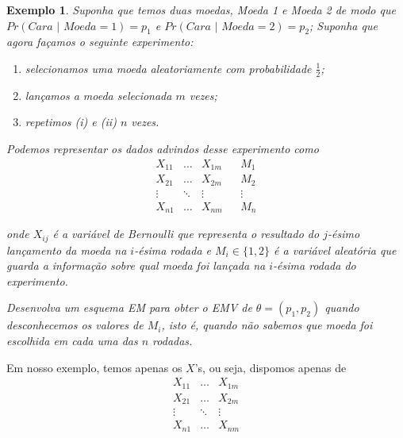 \documentclass{article}
\newtheorem{example}{Exemplo}
\begin{document}
\begin{example}
    \label{example1}
    Suponha que temos duas moedas, Moeda 1 e Moeda 2 de modo que $Pr(\textit{Cara }|\textit{ Moeda} = 1) = p_1$ e $Pr(\textit{Cara }|\textit{ Moeda} = 2) = p_2$; Suponha que agora façamos o seguinte experimento:
    \begin{enumerate}
        \item[(i)]
            selecionamos uma moeda aleatoriamente com probabilidade $\frac{1}{2}$;
            
        \item[(ii)]
            lançamos a moeda selecionada $m$ vezes;
            
        \item[(iii)]
            repetimos (i) e (ii) $n$ vezes.
    \end{enumerate}
        
    Podemos representar os dados advindos desse experimento como
    \begin{equation*}
        \begin{array}{ccccc}
            X_{11} & \dots & X_{1m} & & M_1 \\
            X_{21} & \dots & X_{2m} & & M_2 \\
            \vdots & \ddots & \vdots & & \vdots \\
            X_{n1} & \dots & X_{nm} & & M_n 
        \end{array}
    \end{equation*}
    
    \noindent onde $X_{ij}$ é a variável de Bernoulli que representa o resultado do $j$-ésimo lançamento da moeda na $i$-ésima rodada e $M_i \in \{1, 2\}$ é a variável aleatória que guarda a informação sobre qual moeda foi lançada na $i$-ésima rodada do experimento.
    
    Desenvolva um esquema EM para obter o EMV de $\theta = (p_1, p_2)$ quando desconhecemos os valores de $M_i$, isto é, quando não sabemos que moeda foi escolhida em cada uma das $n$ rodadas.
\end{example}

Em nosso exemplo, temos apenas os $X$'s, ou seja, dispomos apenas de
\begin{equation*}
    \begin{array}{ccc}
        X_{11} & \dots & X_{1m} \\
        X_{21} & \dots & X_{2m} \\
        \vdots & \ddots & \vdots \\
        X_{n1} & \dots & X_{nm} 
    \end{array}
\end{equation*}
\end{document}

